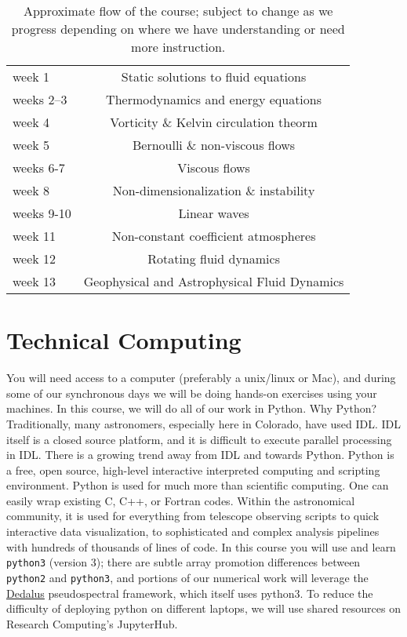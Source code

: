 \documentclass[12pt, preprint]{aastex}
\newcommand{\dedalus}{\href{http://dedalus-project.org}{Dedalus}}
\begin{document}
\begin{table}[h]
  \begin{center}
\begin{tabular}{lc}
  week 1    & Static solutions to fluid equations \\
  weeks 2--3 & Thermodynamics and energy equations \\
  week 4 & Vorticity \& Kelvin circulation theorm \\
  week 5 & Bernoulli \& non-viscous flows \\
  weeks 6-7 & Viscous flows \\
  week 8 & Non-dimensionalization \& instability \\
  weeks 9-10 & Linear waves \\
  week 11 & Non-constant coefficient atmospheres \\
  week 12 & Rotating fluid dynamics \\
  week 13 & Geophysical and Astrophysical Fluid Dynamics
\end{tabular}
\caption{Approximate flow of the course; subject to change as we progress depending on where we have understanding or need more instruction.}
\end{center}
\end{table}

\section*{Technical Computing}

You will need access to a computer (preferably a unix/linux or Mac), and during some of our synchronous days we will be doing hands-on exercises using your machines.  In this course, we will do all of our work in Python.  Why  Python? Traditionally, many astronomers, especially here in Colorado, have used IDL.  IDL  itself is a closed source platform, and it is difficult to execute parallel processing in IDL.  There is  a growing trend away from IDL and towards Python.  Python is a free, open source, high-level  interactive interpreted computing and scripting environment. Python is used for much more than  scientific computing. One can easily wrap existing C, C++, or Fortran codes. Within the  astronomical community, it is used for everything from telescope observing scripts to quick  interactive data visualization, to sophisticated and complex analysis pipelines with hundreds of  thousands of lines of code.  In this course you will use and learn \verb+python3+  (version 3); there are subtle  array promotion differences between \verb+python2+ and \verb+python3+, and portions of our numerical work will leverage the \dedalus{} pseudospectral framework, which itself uses python3.  To reduce the difficulty of deploying python on different laptops, we will use shared resources on Research Computing's JupyterHub.
\end{document}
